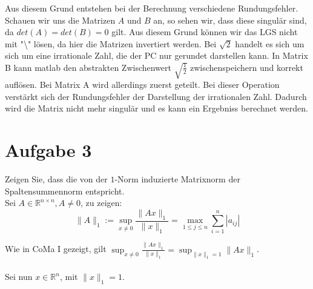 \documentclass[11pt,a4paper,ngerman]{article}
\begin{document}
\begin{description}
          Aus diesem Grund entstehen bei der Berechnung verschiedene Rundungsfehler. \\
          Schauen wir uns die Matrizen $A$ und $B$ an, so sehen wir, dass diese singulär sind,
          da $det(A)=det(B)=0$ gilt. Aus diesem Grund können wir das LGS nicht mit 
          "\textbackslash " lösen, da hier die Matrizen invertiert werden. Bei $\sqrt{2}$ handelt es sich um sich um eine irrationale Zahl, die der PC  nur gerundet 
	darstellen kann. In Matrix B kann matlab den abstrakten Zwischenwert $\sqrt{\frac{1}{2}}$ zwischenspeichern und korrekt auflösen.
	Bei Matrix A wird allerdings zuerst geteilt. Bei dieser Operation verstärkt sich der Rundungsfehler der Darstellung der irrationalen Zahl.
	Dadurch wird die Matrix nicht mehr singulär und es kann ein Ergebniss berechnet werden.

\end{description}


\pagebreak 


\section*{Aufgabe 3}
Zeigen Sie, dass die von der $1$-Norm induzierte Matrixnorm der Spaltensummennorm entspricht. \\

Sei $A \in \mathbb{R}^{n \times n}, A \neq 0$, zu zeigen:
$$ \|A \|_1 := \sup_{x \neq 0}{\frac{\|Ax\|_{1}}{\|x\|_{1}}}
                  =\max_{1 \leq j \leq n}{\sum_{i=1}^{n}{|a_{ij}|}} $$

Wie in CoMa I gezeigt, gilt
$\sup_{x \neq 0}{\frac{\|Ax\|_{1}}{\|x\|_{1}}} = \sup_{\|x\|_{1} = 1}{\|Ax\|_{1}}$. \\ \\
Sei nun $x \in \mathbb{R}^{n}$, mit $\|x\|_{1} = 1$.\\
\end{document}
